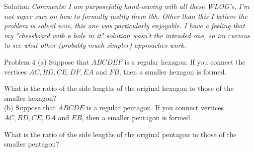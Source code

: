 \documentclass{article}
\begin{document}
\begin{solution}{Solution}
\textit{Comments: I am purposefully hand-waving with all these WLOG's, I'm
not super sure on how to formally justify them tbh. Other than this I
believe the problem is solved now, this one was particularly enjoyable.
I have a feeling that my "chessboard with a hole in it" solution wasn't the
intended one, so im curious to see what other (probably much simpler)
approaches work.}
\end{solution}
\newpage

\begin{problem}{Problem 4}
(a) Suppose that $ABCDEF$ is a regular hexagon. If you connect the
vertices $AC, BD, CE, DF, EA$ and $FB$, then a smaller hexagon is formed.
\vspace{0.2cm}

What is the ratio of the side lengths of the original hexagon to those of
the smaller hexagon?\\

(b) Suppose that $ABCDE$ is a regular pentagon. If you connect vertices
$AC, BD, CE, DA$ and $EB$, then a smaller pentagon is formed. \vspace{0.2cm}

What is the ratio of the side lengths of the original pentagon to those of
the smaller pentagon?
\end{problem}
\end{document}
